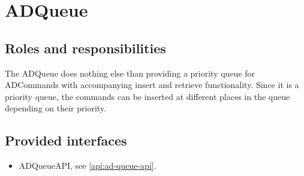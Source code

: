 \section{ADQueue}
\label{element:ad-queue}

\subsection{Roles and responsibilities}

\npar The ADQueue does nothing else than providing a priority queue for
ADCommands with accompanying insert and retrieve functionality. Since
it is a priority queue, the commands can be inserted at different places in
the queue depending on their priority. 

\subsection{Provided interfaces}

\begin{itemize}
  \item ADQueueAPI, see \ref{api:ad-queue-api}.
\end{itemize}
